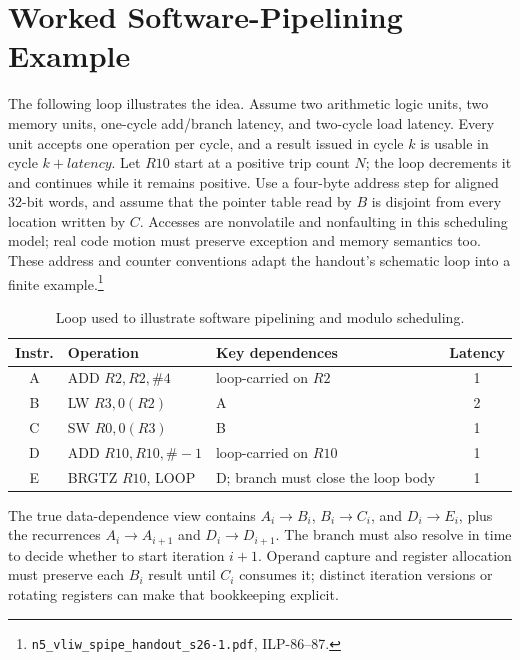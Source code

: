 \section{Worked Software-Pipelining Example}\label{sec:ilp-software-pipelining-example}
The following loop illustrates the idea.
Assume two arithmetic logic units, two memory units, one-cycle add/branch latency, and two-cycle load latency.
Every unit accepts one operation per cycle, and a result issued in cycle $k$ is usable in cycle $k+latency$.
Let $R10$ start at a positive trip count $N$; the loop decrements it and continues while it remains positive.
Use a four-byte address step for aligned 32-bit words, and assume that the pointer table read by $B$ is disjoint from every location written by $C$.
Accesses are nonvolatile and nonfaulting in this scheduling model; real code motion must preserve exception and memory semantics too.
These address and counter conventions adapt the handout's schematic loop into a finite example.\footnote{\texttt{n5\_vliw\_spipe\_handout\_s26-1.pdf}, ILP-86--87.}
\begin{table}[t]
    \centering
    \renewcommand{\arraystretch}{1.15}
    \begin{tabular}{|c|l|l|c|}
        \hline
        Instr.
        & Operation           & Key dependences                    & Latency \\
        \hline
        A & ADD $R2, R2, \#4$   & loop-carried on $R2$               & 1       \\
        \hline
        B & LW $R3, 0(R2)$      & A                                  & 2       \\
        \hline
        C & SW $R0, 0(R3)$      & B                                  & 1       \\
        \hline
        D & ADD $R10, R10, \#-1$ & loop-carried on $R10$              & 1       \\
        \hline
        E & BRGTZ $R10$, LOOP   & D; branch must close the loop body & 1       \\
        \hline
    \end{tabular}
    \caption{Loop used to illustrate software pipelining and modulo scheduling.}
    \label{tab:ilp-swpipe-loop}
\end{table}

The true data-dependence view contains $A_i\rightarrow B_i$, $B_i\rightarrow C_i$, and $D_i\rightarrow E_i$, plus the recurrences $A_i\rightarrow A_{i+1}$ and $D_i\rightarrow D_{i+1}$.
The branch must also resolve in time to decide whether to start iteration $i+1$.
Operand capture and register allocation must preserve each $B_i$ result until $C_i$ consumes it; distinct iteration versions or rotating registers can make that bookkeeping explicit.

